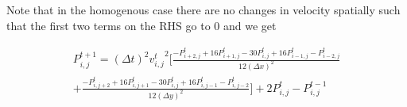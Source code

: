 \documentclass{article}
\begin{document}
Note that in the homogenous case there are no changes in velocity spatially such that the first two terms on the RHS go to 0 and we get 

\begin{multline*}
P_{i,j}^{t+1} = (\Delta t)^2 {v_{i,j}^{t}}^2 \Big[\frac{-P_{i+2,j}^{t} + 16P_{i+1,j}^{t} -30P_{i,j}^{t} +16P_{i-1,j}^{t} - P_{i-2,j}^{t} }{12(\Delta x)^2} \\
+ \frac{-P_{i,j+2}^{t} + 16P_{i,j+1}^{t} -30P_{i,j}^{t} + 16P_{i,j-1}^{t} - P_{i,j-2}^{t} }{12(\Delta y)^2}\Big] + 2P_{i,j}^{t} - P_{i,j}^{t-1}
\end{multline*}
\end{document}
